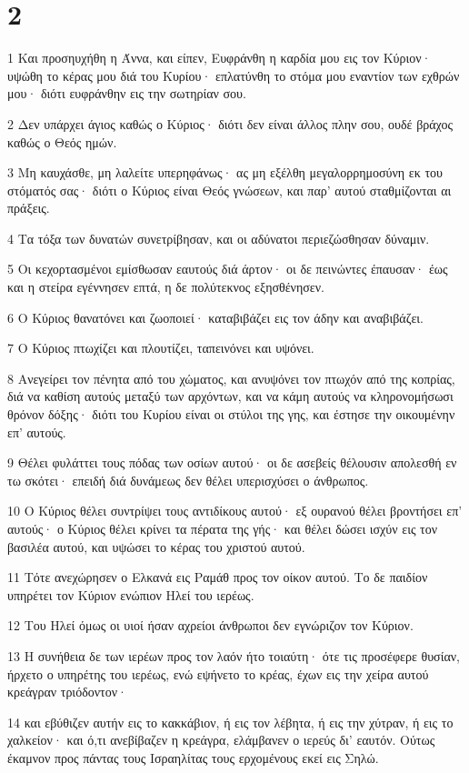 \chapter{2}

\par 1 Και προσηυχήθη η Άννα, και είπεν, Ευφράνθη η καρδία μου εις τον Κύριον· υψώθη το κέρας μου διά του Κυρίου· επλατύνθη το στόμα μου εναντίον των εχθρών μου· διότι ευφράνθην εις την σωτηρίαν σου.
\par 2 Δεν υπάρχει άγιος καθώς ο Κύριος· διότι δεν είναι άλλος πλην σου, ουδέ βράχος καθώς ο Θεός ημών.
\par 3 Μη καυχάσθε, μη λαλείτε υπερηφάνως· ας μη εξέλθη μεγαλορρημοσύνη εκ του στόματός σας· διότι ο Κύριος είναι Θεός γνώσεων, και παρ' αυτού σταθμίζονται αι πράξεις.
\par 4 Τα τόξα των δυνατών συνετρίβησαν, και οι αδύνατοι περιεζώσθησαν δύναμιν.
\par 5 Οι κεχορτασμένοι εμίσθωσαν εαυτούς διά άρτον· οι δε πεινώντες έπαυσαν· έως και η στείρα εγέννησεν επτά, η δε πολύτεκνος εξησθένησεν.
\par 6 Ο Κύριος θανατόνει και ζωοποιεί· καταβιβάζει εις τον άδην και αναβιβάζει.
\par 7 Ο Κύριος πτωχίζει και πλουτίζει, ταπεινόνει και υψόνει.
\par 8 Ανεγείρει τον πένητα από του χώματος, και ανυψόνει τον πτωχόν από της κοπρίας, διά να καθίση αυτούς μεταξύ των αρχόντων, και να κάμη αυτούς να κληρονομήσωσι θρόνον δόξης· διότι του Κυρίου είναι οι στύλοι της γης, και έστησε την οικουμένην επ' αυτούς.
\par 9 Θέλει φυλάττει τους πόδας των οσίων αυτού· οι δε ασεβείς θέλουσιν απολεσθή εν τω σκότει· επειδή διά δυνάμεως δεν θέλει υπερισχύσει ο άνθρωπος.
\par 10 Ο Κύριος θέλει συντρίψει τους αντιδίκους αυτού· εξ ουρανού θέλει βροντήσει επ' αυτούς· ο Κύριος θέλει κρίνει τα πέρατα της γής· και θέλει δώσει ισχύν εις τον βασιλέα αυτού, και υψώσει το κέρας του χριστού αυτού.
\par 11 Τότε ανεχώρησεν ο Ελκανά εις Ραμάθ προς τον οίκον αυτού. Το δε παιδίον υπηρέτει τον Κύριον ενώπιον Ηλεί του ιερέως.
\par 12 Του Ηλεί όμως οι υιοί ήσαν αχρείοι άνθρωποι δεν εγνώριζον τον Κύριον.
\par 13 Η συνήθεια δε των ιερέων προς τον λαόν ήτο τοιαύτη· ότε τις προσέφερε θυσίαν, ήρχετο ο υπηρέτης του ιερέως, ενώ εψήνετο το κρέας, έχων εις την χείρα αυτού κρεάγραν τριόδοντον·
\par 14 και εβύθιζεν αυτήν εις το κακκάβιον, ή εις τον λέβητα, ή εις την χύτραν, ή εις το χαλκείον· και ό,τι ανεβίβαζεν η κρεάγρα, ελάμβανεν ο ιερεύς δι' εαυτόν. Ούτως έκαμνον προς πάντας τους Ισραηλίτας τους ερχομένους εκεί εις Σηλώ.
